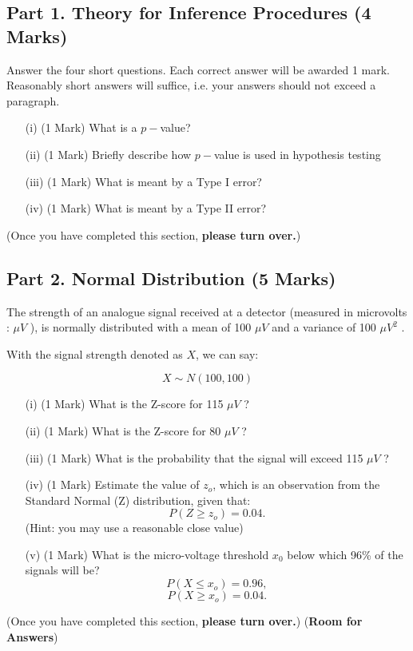 \documentclass[a4paper,12pt]{article}
\begin{document}
\subsection*{Part 1. Theory for Inference Procedures (4 Marks)}
Answer the four short questions. Each correct answer will be awarded 1 mark. Reasonably short answers will suffice, i.e. your answers should not exceed a paragraph.
\begin{itemize}
\item[(i)] (1 Mark) What is a $p-$value?
\item[(ii)] (1 Mark) Briefly describe how $p-$value is used in hypothesis testing
\item[(iii)] (1 Mark) What is meant by a Type I error?
\item[(iv)] (1 Mark) What is meant by a Type II error?
\end{itemize}
(Once you have completed this section, \textbf{please turn over.})
\newpage
\subsection*{Part 2. Normal Distribution (5 Marks)}
The strength of an analogue signal received at a detector (measured in microvolts : $\mu V$ ), is normally distributed with a mean of 100 $\mu V$  
and a variance of 100 $\mu V^2$ . 


\noindent With the signal strength denoted as $X$, we can say:

\[ X \sim N(100,100) \]

\begin{itemize}
\item[(i)] (1 Mark) What is the Z-score for 115 $\mu V$ ? 
\item[(ii)] (1 Mark) What is the Z-score for 80 $\mu V$ ?
\item[(iii)] (1 Mark) What is the probability that the signal will exceed 115 $\mu V$ ? 
\item[(iv)] (1 Mark) Estimate the value of $z_o$, which is an observation from the Standard Normal (Z) distribution, given that:
\[  P(Z \geq z_o) = 0.04.\] 
(Hint: you may use a reasonable close value)
\item[(v)] (1 Mark) What is the micro-voltage threshold $x_0$ below which 96\% of the signals will be? 
\[  P(X \leq x_o) = 0.96,\] 
\[  P(X \geq x_o) = 0.04.\]
\end{itemize}
(Once you have completed this section, \textbf{please turn over.})
\newpage
(\textbf{Room for Answers})
\newpage
\end{document}
